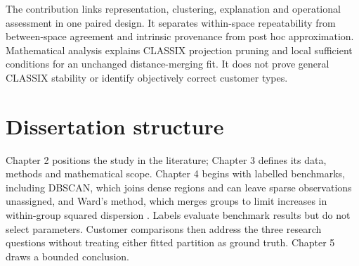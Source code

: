 The contribution links representation, clustering, explanation and operational assessment in one paired design. It separates within-space repeatability from between-space agreement and intrinsic provenance from post hoc approximation. Mathematical analysis explains CLASSIX projection pruning and local sufficient conditions for an unchanged distance-merging fit. It does not prove general CLASSIX stability or identify objectively correct customer types.

\section{Dissertation structure}

Chapter 2 positions the study in the literature; Chapter 3 defines its data, methods and mathematical scope. Chapter 4 begins with labelled benchmarks, including DBSCAN, which joins dense regions and can leave sparse observations unassigned, and Ward's method, which merges groups to limit increases in within-group squared dispersion \citep{ester1996dbscan,ward1963hierarchical}. Labels evaluate benchmark results but do not select parameters. Customer comparisons then address the three research questions without treating either fitted partition as ground truth. Chapter 5 draws a bounded conclusion.
